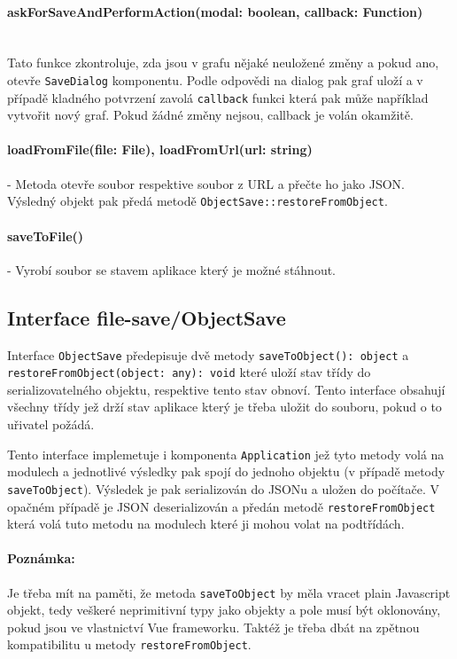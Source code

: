 \paragraph{askForSaveAndPerformAction(modal: boolean, callback: Function)}\mbox{}\\ Tato funkce zkontroluje, zda jsou v grafu nějaké neuložené změny a pokud ano, otevře \texttt{SaveDialog} komponentu. Podle odpovědi na dialog pak graf uloží a v případě kladného potvrzení zavolá \texttt{callback} funkci která pak může například vytvořit nový graf. Pokud žádné změny nejsou, callback je volán okamžitě.

\paragraph{loadFromFile(file: File), loadFromUrl(url: string)} - Metoda otevře soubor respektive soubor z URL a přečte ho jako JSON. Výsledný objekt pak předá metodě \texttt{ObjectSave::restoreFromObject}.

\paragraph{saveToFile()} - Vyrobí soubor se stavem aplikace který je možné stáhnout.

\subsection{Interface file-save/ObjectSave}
Interface \texttt{ObjectSave} předepisuje dvě metody \texttt{saveToObject(): object} a \texttt{restoreFromObject(object: any): void} které uloží stav třídy do serializovatelného objektu, respektive tento stav obnoví. Tento interface obsahují všechny třídy jež drží stav aplikace který je třeba uložit do souboru, pokud o to uřivatel požádá.

Tento interface implemetuje i komponenta \texttt{Application} jež tyto metody volá na modulech a jednotlivé výsledky pak spojí do jednoho objektu (v případě metody \texttt{saveToObject}). Výsledek je pak serializován do JSONu a uložen do počítače. V opačném případě je JSON deserializován a předán metodě \texttt{restoreFromObject} která volá tuto metodu na modulech které ji mohou volat na podtřídách.

\paragraph{Poznámka:} Je třeba mít na paměti, že metoda \texttt{saveToObject} by měla vracet plain Javascript objekt, tedy veškeré neprimitivní typy jako objekty a pole musí být oklonovány, pokud jsou ve vlastnictví Vue frameworku. Taktéž je třeba dbát na zpětnou kompatibilitu u metody \texttt{restoreFromObject}.

